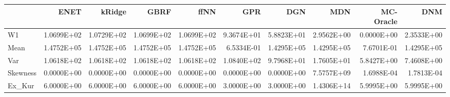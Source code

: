 \begin{tabular}{lrrrrrrrrr}
\toprule
{} &       ENET &     kRidge &       GBRF &       ffNN &        GPR &        DGN &        MDN &  MC-Oracle &        DNM \\
\midrule
W1       & 1.0699E+02 & 1.0729E+02 & 1.0699E+02 & 1.0699E+02 & 9.3674E+01 & 5.8823E+01 & 2.9562E+00 & 0.0000E+00 & 2.3533E+00 \\
Mean     & 1.4752E+05 & 1.4752E+05 & 1.4752E+05 & 1.4752E+05 & 6.5334E-01 & 1.4295E+05 & 1.4295E+05 & 7.6701E-01 & 1.4295E+05 \\
Var      & 1.0618E+02 & 1.0618E+02 & 1.0618E+02 & 1.0618E+02 & 1.0840E+02 & 9.7968E+01 & 1.7605E+01 & 5.8427E+00 & 7.4608E+00 \\
Skewness & 0.0000E+00 & 0.0000E+00 & 0.0000E+00 & 0.0000E+00 & 0.0000E+00 & 0.0000E+00 & 7.5757E+09 & 1.6988E-04 & 1.7813E-04 \\
Ex\_Kur   & 6.0000E+00 & 6.0000E+00 & 6.0000E+00 & 6.0000E+00 & 3.0000E+00 & 3.0000E+00 & 1.4306E+14 & 5.9995E+00 & 5.9995E+00 \\
\bottomrule
\end{tabular}
